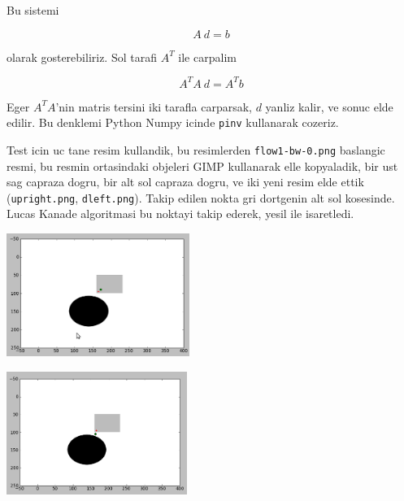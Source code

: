 \documentclass[12pt,fleqn]{article}
\begin{document}
Bu sistemi

\[ A \ d = b \]

olarak gosterebiliriz. Sol tarafi $A^T$ ile carpalim

\[ A^TA \ d = A^Tb \]

Eger $A^TA$'nin matris tersini iki tarafla carparsak, $d$ yanliz kalir, ve
sonuc elde edilir. Bu denklemi Python Numpy icinde \verb!pinv! kullanarak
cozeriz. 

Test icin uc tane resim kullandik, bu resimlerden \verb!flow1-bw-0.png!
baslangic resmi, bu resmin ortasindaki objeleri GIMP kullanarak elle
kopyaladik, bir ust sag capraza dogru, bir alt sol capraza dogru, ve iki
yeni resim elde ettik (\verb!upright.png!, \verb!dleft.png!). Takip edilen
nokta gri dortgenin alt sol kosesinde. Lucas Kanade algoritmasi bu noktayi
takip ederek, yesil ile isaretledi.

\includegraphics[height=4cm]{res1.png}

\includegraphics[height=4cm]{res2.png}




\end{document}
